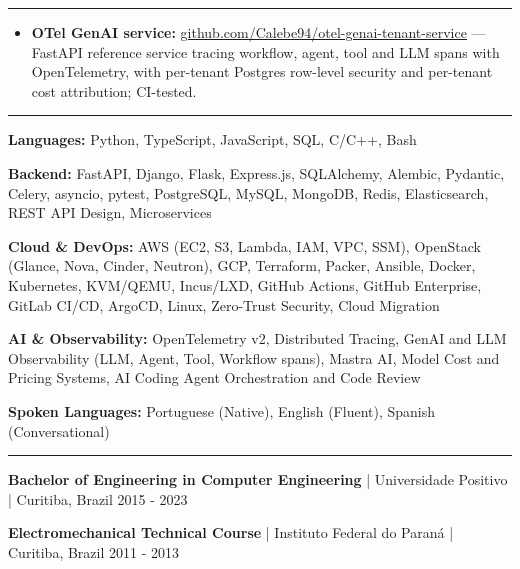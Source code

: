 \documentclass[11pt,letterpaper]{article}
\newcommand{\resumesection}[1]{%
  \vspace{8pt}{\large\bfseries #1}\par\vspace{2pt}\hrule\vspace{4pt}}
\newenvironment{bullets}
  {\begin{itemize}\setlength{\itemsep}{1pt}\setlength{\parskip}{0pt}\setlength{\topsep}{2pt}}
  {\end{itemize}}
\begin{document}
\resumesection{Selected Projects}
\begin{bullets}
\item \textbf{OTel GenAI service:} \href{https://github.com/Calebe94/otel-genai-tenant-service}{github.com/Calebe94/otel-genai-tenant-service} --- FastAPI reference service tracing workflow, agent, tool and LLM spans with OpenTelemetry, with per-tenant Postgres row-level security and per-tenant cost attribution; CI-tested.
\end{bullets}

\resumesection{Technical Skills}
\textbf{Languages:} Python, TypeScript, JavaScript, SQL, C/C++, Bash\par\vspace{2pt}
\textbf{Backend:} FastAPI, Django, Flask, Express.js, SQLAlchemy, Alembic, Pydantic, Celery, asyncio, pytest, PostgreSQL, MySQL, MongoDB, Redis, Elasticsearch, REST API Design, Microservices\par\vspace{2pt}
\textbf{Cloud \& DevOps:} AWS (EC2, S3, Lambda, IAM, VPC, SSM), OpenStack (Glance, Nova, Cinder, Neutron), GCP, Terraform, Packer, Ansible, Docker, Kubernetes, KVM/QEMU, Incus/LXD, GitHub Actions, GitHub Enterprise, GitLab CI/CD, ArgoCD, Linux, Zero-Trust Security, Cloud Migration\par\vspace{2pt}
\textbf{AI \& Observability:} OpenTelemetry v2, Distributed Tracing, GenAI and LLM Observability (LLM, Agent, Tool, Workflow spans), Mastra AI, Model Cost and Pricing Systems, AI Coding Agent Orchestration and Code Review\par\vspace{2pt}
\textbf{Spoken Languages:} Portuguese (Native), English (Fluent), Spanish (Conversational)

\resumesection{Education}
\textbf{Bachelor of Engineering in Computer Engineering} | Universidade Positivo | Curitiba, Brazil \hfill 2015 - 2023\par\vspace{2pt}
\textbf{Electromechanical Technical Course} | Instituto Federal do Paran\'a | Curitiba, Brazil \hfill 2011 - 2013\par
\end{document}
